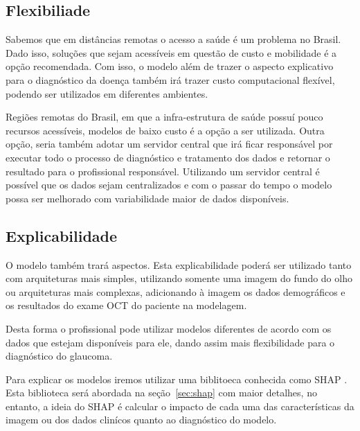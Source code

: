\documentclass[ %
	msc, %
	portugues %
]{../ppgccufmg}
\begin{document}
			\subsection{Flexibiliade}
                Sabemos que em distâncias remotas o acesso a saúde é um problema no Brasil. Dado
                isso, soluções que sejam acessíveis em questão de custo e mobilidade é a
                opção recomendada. Com isso, o modelo além de trazer o aspecto explicativo para o diagnóstico
                da doença também irá trazer custo computacional flexível, podendo ser utilizados em
                diferentes ambientes.

                Regiões remotas do Brasil, em que a infra-estrutura de saúde possuí pouco
                recursos acessíveis, modelos de baixo custo é a opção a ser utilizada.
                Outra opção, seria também adotar um servidor central que
                irá ficar responsável por executar todo o processo de diagnóstico e tratamento dos
                dados e retornar o resultado para o profissional responsável. Utilizando um servidor central
                é possível que os dados sejam centralizados e com o passar do tempo o modelo possa
                ser melhorado com variabilidade maior de dados disponíveis.

			\subsection{Explicabilidade}
                O modelo também trará aspectos. Esta explicabilidade poderá ser utilizado tanto com
                arquiteturas mais simples, utilizando somente uma imagem do fundo do olho ou
                arquiteturas mais complexas, adicionando à imagem os dados demográficos e os
                resultados do exame OCT do paciente na modelagem.

                Desta forma o profissional pode utilizar modelos diferentes de acordo com os dados
                que estejam disponíveis para ele, dando assim mais flexibilidade para o diagnóstico
                do glaucoma.

                Para explicar os modelos iremos utilizar uma biblitoeca conhecida como SHAP
                \citep{shapley1988shapley}. Esta biblioteca será abordada na seção~\ref{sec:shap} com
                maior detalhes, no entanto, a ideia do SHAP é calcular o impacto de cada uma das
                características da imagem ou dos dados clinícos quanto ao diagnóstico do modelo.
\end{document}
